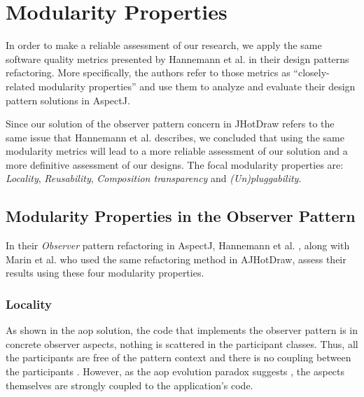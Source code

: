 \section{Modularity Properties}\label{Eval Modularity Properties}

In order to make a reliable assessment of our research, we apply the same software quality metrics presented by Hannemann et al. \cite{hannemann2002design} in their design patterns refactoring.
More specifically, the authors refer to those metrics as ``closely-related modularity properties'' and use them to analyze and evaluate their design pattern solutions in AspectJ.

Since our solution of the observer pattern concern in JHotDraw refers to the same issue that Hannemann et al. \cite{hannemann2005role} describes, we concluded that using the same modularity metrics will lead to a more reliable assessment of our solution and a more definitive assessment of our designs.
The focal modularity properties are: \textit{Locality}, \textit{Reusability}, \textit{Composition transparency} and \textit{(Un)pluggability}. 

\subsection{Modularity Properties in the Observer Pattern}

In their \textit{Observer} pattern refactoring in AspectJ, Hannemann et al. \cite{hannemann2005role}, along with Marin et al. \cite{marin2005approach} who used the same refactoring method in AJHotDraw, assess their results using these four modularity properties.

\subsubsection{Locality}

As shown in the \ac{aop} solution, the code that implements the observer pattern is in concrete observer aspects, nothing is scattered in the participant classes. 
Thus, all the participants are free of the pattern context and there is no coupling between the participants \cite{hannemann2005role}.
However, as the \ac{aop} evolution paradox suggests \cite{tourwe2003existence}, the aspects themselves are strongly coupled to the application's code.

